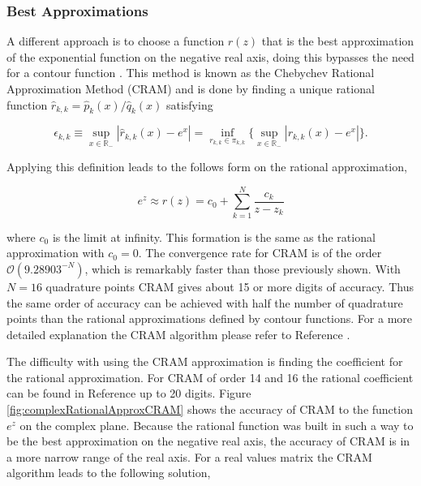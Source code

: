\subsubsection{Best Approximations}
A different approach is to choose a function $r(z)$ that is the best approximation of the exponential function on the negative real axis, doing this bypasses the need for a contour function \cite{pusaThesis} \cite{Trefethen2006}. This method is known as the Chebychev Rational Approximation Method (CRAM) and is done by finding a unique rational function $\hat{r}_{k,k} = \hat{p}_{k}(x)/\hat{q}_{k}(x)$ satisfying 

\begin{equation}
    \epsilon_{k,k} \equiv \sup_{x \in \mathbb{R}_{-}} |\hat{r}_{k,k}(x) - e^{x}| = \inf_{r_{k,k} \in \pi_{k,k}}\bigg\{ \sup_{x \in \mathbb{R}_{-}} |r_{k,k}(x) - e^{x}|\bigg\}.
\end{equation}

\noindent Applying this definition leads to the follows form on the rational approximation,

\begin{equation}
    e^{z} \approx r(z) = c_{0} + \sum_{k=1}^{N}\frac{c_{k}}{z - z_{k}}
\end{equation}


\noindent where $c_{0}$ is the limit at infinity. This formation is the same as the rational approximation with $c_{0} = 0$. The convergence rate for CRAM is of the order $\mathcal{O}(9.28903^{-N} )$, which is remarkably faster than those previously shown. With $N=16$ quadrature points CRAM gives about 15 or more digits of accuracy. Thus the same order of accuracy can be achieved with half the number of quadrature points than the rational approximations defined by contour functions. For a more detailed explanation the CRAM algorithm please refer to Reference \cite{pusaThesis}. 

The difficulty with using the CRAM approximation is finding the coefficient for the rational approximation. For CRAM of order 14 and 16 the rational coefficient can be found in Reference \cite{pusa2011} up to 20 digits. Figure \ref{fig:complexRationalApproxCRAM} shows the accuracy of CRAM to the function $e^{z}$ on the complex plane. Because the rational function was built in such a way to be the best approximation on the negative real axis, the accuracy of CRAM is in a more narrow range of the real axis. For a real values matrix the CRAM algorithm leads to the following solution,

